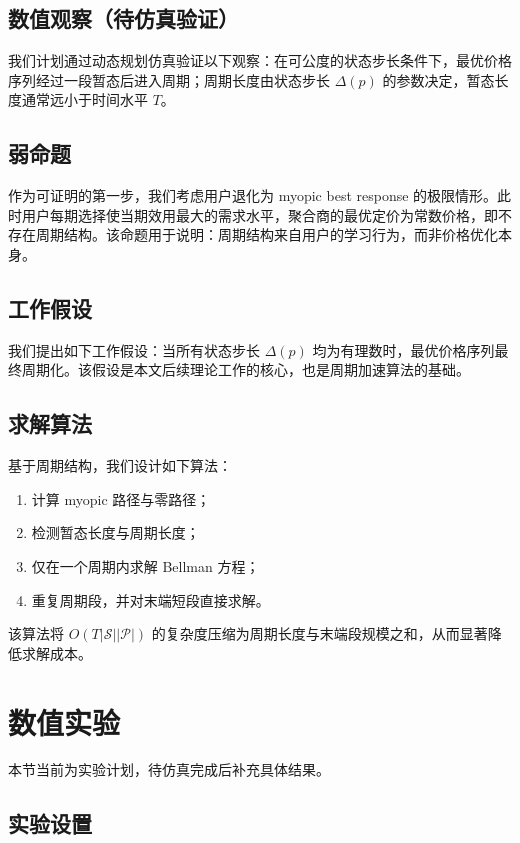 \documentclass[UTF8]{ctexart}
\begin{document}
\subsection{数值观察（待仿真验证）}

我们计划通过动态规划仿真验证以下观察：在可公度的状态步长条件下，最优价格序列经过一段暂态后进入周期；周期长度由状态步长 $\Delta(p)$ 的参数决定，暂态长度通常远小于时间水平 $T$。

\subsection{弱命题}

作为可证明的第一步，我们考虑用户退化为 myopic best response 的极限情形。此时用户每期选择使当期效用最大的需求水平，聚合商的最优定价为常数价格，即不存在周期结构。该命题用于说明：周期结构来自用户的学习行为，而非价格优化本身。

\subsection{工作假设}

我们提出如下工作假设：当所有状态步长 $\Delta(p)$ 均为有理数时，最优价格序列最终周期化。该假设是本文后续理论工作的核心，也是周期加速算法的基础。

\subsection{求解算法}

基于周期结构，我们设计如下算法：
\begin{enumerate}
    \item 计算 myopic 路径与零路径；
    \item 检测暂态长度与周期长度；
    \item 仅在一个周期内求解 Bellman 方程；
    \item 重复周期段，并对末端短段直接求解。
\end{enumerate}

该算法将 $O(T |\mathcal{S}| |\mathcal{P}|)$ 的复杂度压缩为周期长度与末端段规模之和，从而显著降低求解成本。

\section{数值实验}

本节当前为实验计划，待仿真完成后补充具体结果。

\subsection{实验设置}
\end{document}
